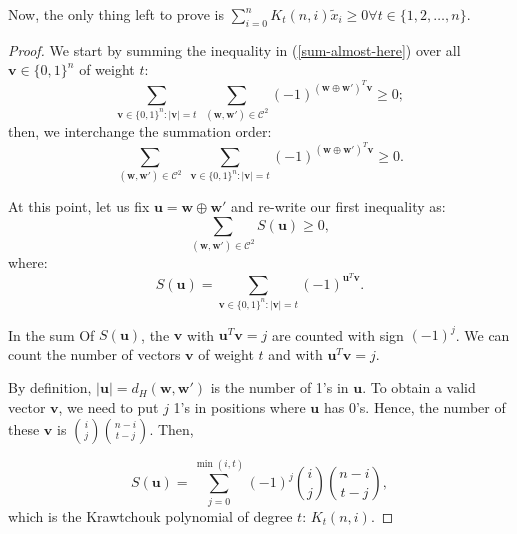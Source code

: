 \begin{lemma}
    Now, the only thing left to prove is $\sum_{i=0}^{n}K_t(n,i)\tilde{x}_i\geq 0 \forall t\in\{1,2,\ldots,n\}$.

    \begin{proof}
        We start by summing the inequality in (\ref{sum-almost-here}) over all $\mathbf{v}\in \{0,1\}^n$ of weight $t$:
        \begin{equation}
            \sum_{\mathbf{v}\in \{0,1\}^n:|\mathbf{v}|=t}\;\sum_{(\mathbf{w}, \mathbf{w}')\in\mathcal{C}^2}(-1)^{(\textbf{w} \oplus \textbf{w}')^T\mathbf{v}} \geq 0;
        \end{equation}
        then, we interchange the summation order:
        \begin{equation}
            \sum_{(\mathbf{w}, \mathbf{w}')\in\mathcal{C}^2}\;\sum_{\mathbf{v}\in \{0,1\}^n:|\mathbf{v}|=t}(-1)^{(\textbf{w} \oplus \textbf{w}')^T\mathbf{v}} \geq 0.
        \end{equation}

        At this point, let us fix $\mathbf{u} = \textbf{w} \oplus \textbf{w}'$ and re-write our first inequality as:
        \begin{equation}
            \label{s-u-inequality}
            \sum_{(\mathbf{w}, \mathbf{w}')\in\mathcal{C}^2}S(\mathbf{u}) \geq 0,
        \end{equation}
        where:
        \begin{equation}
            S(\mathbf{u})=\sum_{\mathbf{v}\in \{0,1\}^n:|\mathbf{v}|=t}(-1)^{\mathbf{u}^T\mathbf{v}}.
        \end{equation}
        

        In the sum Of $S(\mathbf{u})$, the $\mathbf{v}$ with $\mathbf{u}^T\mathbf{v}=j$ are counted with sign $(-1)^j$. We can count the number of vectors $\mathbf{v}$ of weight $t$ and with $\mathbf{u}^T\mathbf{v}=j$.

        By definition, $|\mathbf{u}|=d_H(\mathbf{w}, \mathbf{w}')$ is the number of 1's in $\mathbf{u}$. To obtain a valid vector $\mathbf{v}$, we need to put $j$ 1's in positions where $\mathbf{u}$ has 0's.
        Hence, the number of these $\mathbf{v}$ is ${i \choose j}{n-i \choose t-j}$. Then,

        \begin{equation}
            S(\mathbf{u})=\sum_{j=0}^{\min(i,t)}(-1)^j{i \choose j}{n-i \choose t-j},
        \end{equation}
        which is the Krawtchouk polynomial of degree $t$: $K_t(n,i)$.
        

\end{proof}
\end{lemma}

